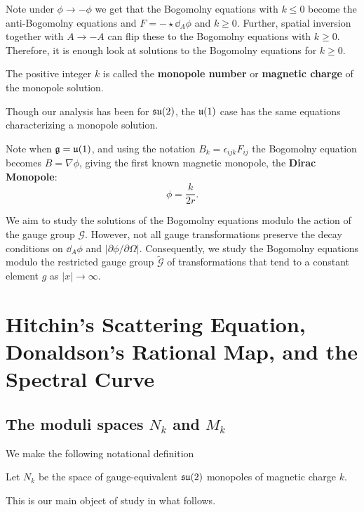 	Note under $\phi \to -\phi$ we get that the Bogomolny equations with $k \leq 0$ become the anti-Bogomolny equations and $F = -\star \dd_A \phi$ and $k \geq 0$. Further, spatial inversion together with $A\to-A$ can flip these to the Bogomolny equations with $k \geq 0$. Therefore, it is enough look at solutions to the Bogomolny equations for $k \geq 0$.
	
	\begin{defn}
		The positive integer $k$ is called the \textbf{monopole number} or \textbf{magnetic charge} of the monopole solution.
	\end{defn}
	
	Though our analysis has been for $\frak{su}(2)$, the $\frak{u}(1)$ case has the same equations characterizing a monopole solution.
	\begin{obs}
		Note when $\frak g = \frak u(1)$, and using the notation $B_k = \epsilon_{ijk} F_{ij}$ the Bogomolny equation becomes $B = \nabla \phi$, giving the first known magnetic monopole, the \textbf{Dirac Monopole}:
		\begin{equation*}
			\phi = \frac{k}{2r}.
		\end{equation*}
	\end{obs}
	
	\begin{nb}
		We aim to study the solutions of the Bogomolny equations modulo the action of the gauge group $\mathcal G$. However, not all gauge transformations preserve the decay conditions on $\dd_A \phi$ and $|\partial \phi/\partial \Omega|$. Consequently, we study the Bogomolny equations modulo the restricted gauge group $\tilde{\mathcal G}$ of transformations that tend to a constant element $g$ as $|x| \to \infty$.
	\end{nb}
	
	
	\section{Hitchin's Scattering Equation, Donaldson's Rational Map, and the Spectral Curve}
	
	\subsection{The moduli spaces $N_k$ and $M_k$} %
	\label{sub:the_moduli_spaces_n_k_and_m_k}

	
	We make the following notational definition
	\begin{defn}
		Let $N_k$ be the space of gauge-equivalent $\frak{su}(2)$ monopoles of magnetic charge $k$.
	\end{defn}
	This is our main object of study in what follows.
	
